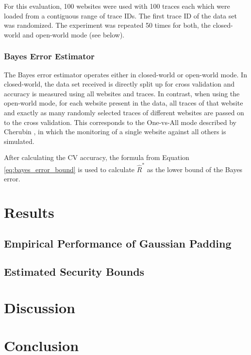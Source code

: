 \documentclass[
	ruledheaders=chapter,
	class=report,
	thesis={type=master, department=inf},
	accentcolor=1c,
	custommargins=true,
	marginpar=false,
	parskip=half-,
	fontsize=11pt,
]{tudapub}
\begin{document}
	For this evaluation, 100 websites were used with 100 traces each which were loaded from a contiguous range of trace IDs. The first trace ID of the data set was randomized. The experiment was repeated 50 times for both, the closed-world and open-world mode (see below).
	
	\subsection{Bayes Error Estimator}
	
	The Bayes error estimator operates either in closed-world or open-world mode. In closed-world, the data set received is directly split up for cross validation and accuracy is measured using all websites and traces. In contrast, when using the open-world mode, for each website present in the data, all traces of that website and exactly as many randomly selected traces of different websites are passed on to the cross validation. This corresponds to the One-vs-All mode described by Cherubin \cite{Cherubin2017}, in which the monitoring of a single website against all others is simulated.
	
	After calculating the CV accuracy, the formula from Equation \ref{eq:bayes_error_bound} is used to calculate $\widehat{R}^*$ as the lower bound of the Bayes error.
	

	\chapter{Results}
	\label{results}

	\section{Empirical Performance of Gaussian Padding}
	\label{performance}

	\section{Estimated Security Bounds}
	\label{security_bounds}

	\chapter{Discussion}
	\label{discussion}

	\chapter{Conclusion}
	\label{conclusion}

	\pagebreak
	\setcounter{page}{5}
	\printbibliography

	\cleardoublepage
	\listoffigures

	\cleardoublepage
	\listoftables
\end{document}
